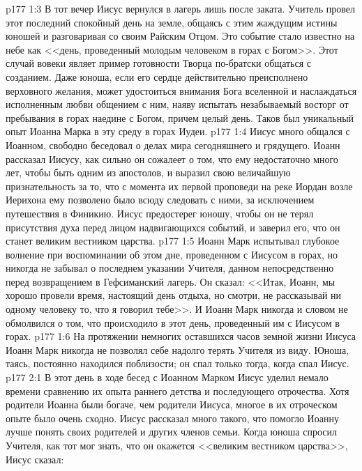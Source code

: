 \vs p177 1:3 В тот вечер Иисус вернулся в лагерь лишь после заката. Учитель провел этот последний спокойный день на земле, общаясь с этим жаждущим истины юношей и разговаривая со своим Райским Отцом. Это событие стало известно на небе как <<день, проведенный молодым человеком в горах с Богом>>. Этот случай вовеки являет пример готовности Творца по\hyp{}братски общаться с созданием. Даже юноша, если его сердце действительно преисполнено верховного желания, может удостоиться внимания Бога вселенной и наслаждаться исполненным любви общением с ним, наяву испытать незабываемый восторг от пребывания в горах наедине с Богом, причем целый день. Таков был уникальный опыт Иоанна Марка в эту среду в горах Иудеи.
\vs p177 1:4 Иисус много общался с Иоанном, свободно беседовал о делах мира сегодняшнего и грядущего. Иоанн рассказал Иисусу, как сильно он сожалеет о том, что ему недостаточно много лет, чтобы быть одним из апостолов, и выразил свою величайшую признательность за то, что с момента их первой проповеди на реке Иордан возле Иерихона ему позволено было всюду следовать с ними, за исключением путешествия в Финикию. Иисус предостерег юношу, чтобы он не терял присутствия духа перед лицом надвигающихся событий, и заверил его, что он станет великим вестником царства.
\vs p177 1:5 Иоанн Марк испытывал глубокое волнение при воспоминании об этом дне, проведенном с Иисусом в горах, но никогда не забывал о последнем указании Учителя, данном непосредственно перед возвращением в Гефсиманский лагерь. Он сказал: <<Итак, Иоанн, мы хорошо провели время, настоящий день отдыха, но смотри, не рассказывай ни одному человеку то, что я говорил тебе>>. И Иоанн Марк никогда и словом не обмолвился о том, что происходило в этот день, проведенный им с Иисусом в горах.
\vs p177 1:6 На протяжении немногих оставшихся часов земной жизни Иисуса Иоанн Марк никогда не позволял себе надолго терять Учителя из виду. Юноша, таясь, постоянно находился поблизости; он спал только тогда, когда спал Иисус.
\vs p177 2:1 В этот день в ходе бесед с Иоанном Марком Иисус уделил немало времени сравнению их опыта раннего детства и последующего отрочества. Хотя родители Иоанна были богаче, чем родители Иисуса, многое в их отроческом опыте было очень сходно. Иисус рассказал много такого, что помогло Иоанну лучше понять своих родителей и других членов семьи. Когда юноша спросил Учителя, как тот мог знать, что он окажется <<великим вестником царства>>, Иисус сказал:
